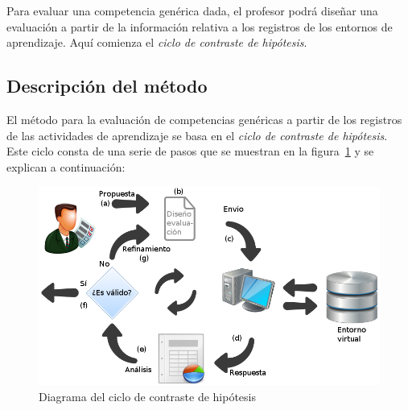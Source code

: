 Para evaluar una competencia genérica dada, el profesor podrá diseñar una evaluación a partir de la información relativa a los registros de los entornos de aprendizaje. Aquí comienza el  \emph{ciclo de contraste de hipótesis}. 





\subsection{Descripción del método}

El método para la evaluación de competencias genéricas a partir de los registros de las actividades de aprendizaje se basa en el \emph{ciclo de contraste de hipótesis}. Este ciclo consta de una serie de pasos que se muestran en la figura~\ref{fig:CCHDiagram} y se explican a continuación:

\begin{figure}
  \begin{center}
    \includegraphics[scale=0.45]{CCHDiagram.png}
  \end{center}
  \caption{Diagrama del ciclo de contraste de hipótesis}
  \label{fig:CCHDiagram}
\end{figure}

